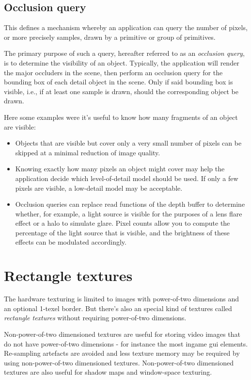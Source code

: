 \subsection{Occlusion query}
This defines a mechanism whereby an application can query the number of pixels, or more precisely samples, drawn by a primitive or group of primitives.

The primary purpose of such a query, hereafter referred to as an \emph{occlusion query}, is to determine the visibility of an object. Typically, the application will render the major occluders in the scene, then perform an occlusion query for the bounding box of each detail object in the scene. Only if said bounding box is visible, i.e., if at least one sample is drawn, should the corresponding object be drawn.

Here some examples were it's useful to know how many fragments of an object are visible:
\begin{itemize}
\item{Objects that are visible but cover only a very small number of pixels can be skipped at a minimal reduction of image quality.}
\item{Knowing exactly how many pixels an object might cover may help the application decide which level-of-detail model should be used. If only a few pixels are visible, a low-detail model may be acceptable.}
\item{Occlusion queries can replace read functions of the depth buffer to determine whether, for example, a light source is visible for the purposes of a lens flare effect or a halo to simulate glare. Pixel counts allow you to compute the percentage of the light source that is visible, and the brightness of these effects can be modulated accordingly.}
\end{itemize}





\section{Rectangle textures}
\hypertarget{Rectangle textures}{}
The hardware texturing is limited to images with power-of-two dimensions and an optional 1-texel border. But there's also an special kind of textures called \emph{rectangle textures} without requiring power-of-two dimensions.

Non-power-of-two dimensioned textures are useful for storing video images that do not have power-of-two dimensions - for instance the most ingame gui elements. Re-sampling artefacts are avoided and less texture memory may be required by using non-power-of-two dimensioned textures. Non-power-of-two dimensioned textures are also useful for shadow maps and window-space texturing.


